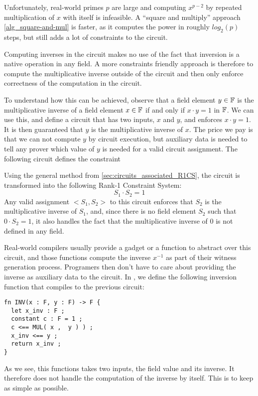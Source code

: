 Unfortunately, real-world primes $p$ are large and computing $x^{p-2}$ by repeated multiplication of $x$ with itself is infeasible. A ``square and multiply'' approach \ref{alg_square-and-mul} is faster, as it computes the power in roughly $log_2(p)$ steps, but still adds a lot of constraints to the circuit. 

Computing inverses in the circuit makes no use of the fact that inversion is a native operation in any field. A more constraints friendly approach is therefore to compute the multiplicative inverse outside of the circuit and then only enforce correctness of the computation in the circuit. 

To understand how this can be achieved, observe that a field element $y\in \mathbb{F}$ is the multiplicative inverse of a field element $x\in \mathbb{F}$ if and only if $x\cdot y =1$ in $\mathbb{F}$. We can use this, and define a circuit that has two inputs, $x$ and $y$, and enforces $x\cdot y =1$. It is then guaranteed that $y$ is the multiplicative inverse of $x$. The price we pay is that we can not compute $y$ by circuit execution, but auxiliary data is needed to tell any prover which value of $y$ is needed for a valid circuit assignment.  The following circuit defines the constraint
\begin{center}
\label{circ:inversion}
\end{center}
Using the general method from \ref{sec:circuits_associated_R1CS}, the circuit is transformed into the following Rank-1 Constraint System:
\begin{equation}
S_1 \cdot S_2 = 1
\end{equation}
Any valid assignment $<S_1,S_2>$ to this circuit enforces that $S_2$ is the multiplicative inverse of $S_1$, and, since there is no field element $S_2$ such that $0\cdot S_2=1$, it also handles the fact that the multiplicative inverse of $0$ is not defined in any field. 

Real-world compilers usually provide a gadget or a function to abstract over this circuit, and those functions compute the inverse $x^{-1}$ as part of their witness generation process. Programers then don't have to care about providing the inverse as auxiliary data to the circuit. In , we define the following inversion function that compiles to the previous circuit:
\begin{lstlisting}
fn INV(x : F, y : F) -> F {
  let x_inv : F ;
  constant c : F = 1 ;
  c <== MUL( x ,  y ) ) ;
  x_inv <== y ;
  return x_inv ;
}
\end{lstlisting}
As we see, this functions takes two inputs, the field value and its inverse. It therefore does not handle the computation of the inverse by itself. This is to keep  as simple as possible. 

